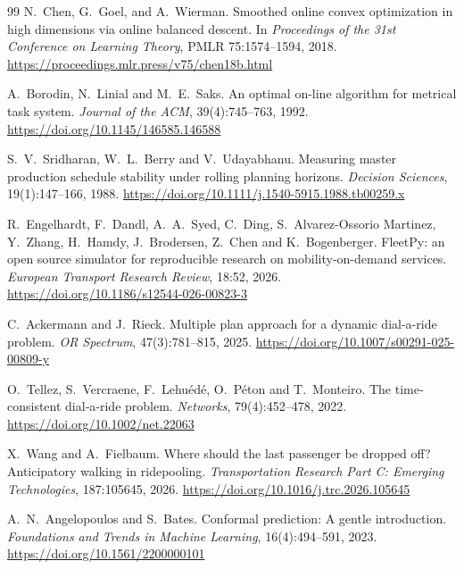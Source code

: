 \begin{thebibliography}{99}
N.~Chen, G.~Goel, and A.~Wierman.
\newblock Smoothed online convex optimization in high dimensions via online balanced descent.
\newblock In \emph{Proceedings of the 31st Conference on Learning Theory}, PMLR 75:1574--1594,
2018.
\newblock \url{https://proceedings.mlr.press/v75/chen18b.html}

A.~Borodin, N.~Linial and M.~E.~Saks.
\newblock An optimal on-line algorithm for metrical task system.
\newblock \emph{Journal of the ACM}, 39(4):745--763, 1992.
\newblock \url{https://doi.org/10.1145/146585.146588}

S.~V.~Sridharan, W.~L.~Berry and V.~Udayabhanu.
\newblock Measuring master production schedule stability under rolling planning horizons.
\newblock \emph{Decision Sciences}, 19(1):147--166, 1988.
\newblock \url{https://doi.org/10.1111/j.1540-5915.1988.tb00259.x}

R.~Engelhardt, F.~Dandl, A.~A.~Syed, C.~Ding, S.~Alvarez-Ossorio Martinez, Y.~Zhang, H.~Hamdy, J.~Brodersen, Z.~Chen and K.~Bogenberger.
\newblock FleetPy: an open source simulator for reproducible research on mobility-on-demand services.
\newblock \emph{European Transport Research Review}, 18:52, 2026.
\newblock \url{https://doi.org/10.1186/s12544-026-00823-3}

C.~Ackermann and J.~Rieck.
\newblock Multiple plan approach for a dynamic dial-a-ride problem.
\newblock \emph{OR Spectrum}, 47(3):781--815, 2025.
\newblock \url{https://doi.org/10.1007/s00291-025-00809-y}

O.~Tellez, S.~Vercraene, F.~Lehuédé, O.~Péton and T.~Monteiro.
\newblock The time‐consistent dial‐a‐ride problem.
\newblock \emph{Networks}, 79(4):452--478, 2022.
\newblock \url{https://doi.org/10.1002/net.22063}

X.~Wang and A.~Fielbaum.
\newblock Where should the last passenger be dropped off? Anticipatory walking in ridepooling.
\newblock \emph{Transportation Research Part C: Emerging Technologies}, 187:105645, 2026.
\newblock \url{https://doi.org/10.1016/j.trc.2026.105645}

A.~N.~Angelopoulos and S.~Bates.
\newblock Conformal prediction: A gentle introduction.
\newblock \emph{Foundations and Trends in Machine Learning}, 16(4):494--591, 2023.
\newblock \url{https://doi.org/10.1561/2200000101}
\end{thebibliography}



